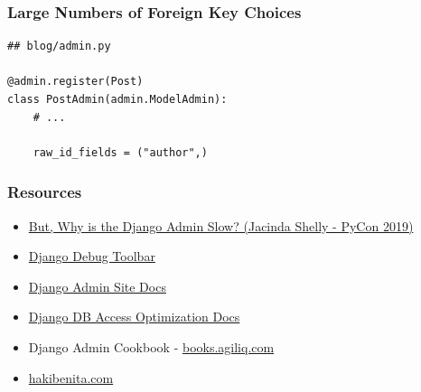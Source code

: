 \documentclass[aspectratio=169]{beamer}
\begin{document}
\begin{frame}[fragile]
\frametitle{Large Numbers of Foreign Key Choices}

{\tiny
\begin{verbatim}
## blog/admin.py

@admin.register(Post)
class PostAdmin(admin.ModelAdmin):
    # ...

    raw_id_fields = ("author",)
\end{verbatim}
}

\end{frame}


\begin{frame}
  \begin{figure}[p]
    \centering
  \end{figure}
\end{frame}


\begin{frame}
\frametitle{Resources}
  \begin{itemize}
    \item {\small \href{https://www.youtube.com/watch?v=f8cFjiyxQuQ}{But, Why is the Django Admin Slow? (Jacinda Shelly - PyCon 2019)}}
    \item {\small \href{https://django-debug-toolbar.readthedocs.io/en/latest/}{Django Debug Toolbar}}
    \item {\small \href{https://docs.djangoproject.com/en/2.2/ref/contrib/admin/}{Django Admin Site Docs}}
    \item {\small \href{https://docs.djangoproject.com/en/2.2/topics/db/optimization/}{Django DB Access Optimization Docs}}
    \item {\small Django Admin Cookbook - \href{https://books.agiliq.com/projects/django-admin-cookbook}{books.agiliq.com}}
    \item {\small \href{https://hakibenita.com/tag/django-admin}{hakibenita.com}}
  \end{itemize}
\end{frame}
\end{document}
